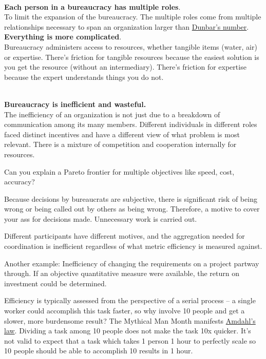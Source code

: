 \ \\

\textbf{Each person in a bureaucracy has multiple roles}.\\
To limit the expansion of the bureaucracy. The multiple roles come from multiple relationships necessary to span an organization larger than \href{https://en.wikipedia.org/wiki/Dunbar\%27s_number}{Dunbar's number}. 
\ \\

\textbf{Everything is more complicated}. \\
Bureaucracy administers access to resources, whether tangible items (water, air) or expertise. There's friction for tangible resources because the easiest solution is you get the resource (without an intermediary). There's friction for expertise because the expert understands things you do not. 

\ \\

\textbf{Bureaucracy is inefficient and wasteful.}\\
The inefficiency of an organization is not just due to a breakdown of communication among its many members. Different individuals in different roles faced distinct incentives and have a different view of what problem is most relevant. There is a mixture of competition and cooperation internally for resources.


Can you explain a Pareto frontier for multiple objectives like speed, cost, accuracy?

Because decisions by bureaucrats are subjective, there is significant risk of being wrong or being called out by others as being wrong. Therefore, a motive to cover your ass for decisions made. Unnecessary work is carried out. 

Different participants have different motives, and the aggregation needed for coordination is inefficient regardless of what metric efficiency is measured against.

Another example: Inefficiency of changing the requirements on a project partway through. If an objective quantitative measure were available, the return on investment could be determined. 

Efficiency is typically assessed from the perspective of a serial process -- a single worker could accomplish this task faster, so why involve 10 people and get a slower, more burdensome result? The Mythical Man Month manifests \href{https://en.wikipedia.org/wiki/Amdahl\%27s_law}{Amdahl's law}. Dividing a task among 10 people does not make the task 10x quicker. It's not valid to expect that a task which takes 1 person 1 hour to perfectly scale so 10 people should be able to accomplish 10 results in 1 hour.

